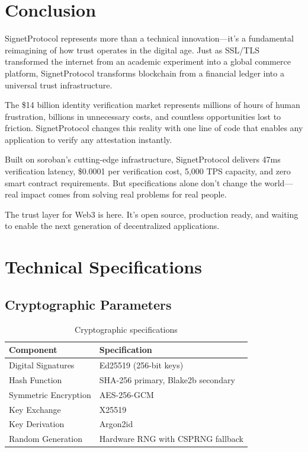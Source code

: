 \documentclass[11pt,a4paper]{article}
\begin{document}
\section{Conclusion}\label{sec:conclusion}

SignetProtocol represents more than a technical innovation---it's a fundamental reimagining of how trust operates in the digital age. Just as SSL/TLS transformed the internet from an academic experiment into a global commerce platform, SignetProtocol transforms blockchain from a financial ledger into a universal trust infrastructure.

The \$14 billion identity verification market represents millions of hours of human frustration, billions in unnecessary costs, and countless opportunities lost to friction. SignetProtocol changes this reality with one line of code that enables any application to verify any attestation instantly.

Built on \gls{soroban}'s cutting-edge infrastructure, SignetProtocol delivers 47ms verification latency, \$0.0001 per verification cost, 5,000 TPS capacity, and zero smart contract requirements. But specifications alone don't change the world---real impact comes from solving real problems for real people.

The trust layer for Web3 is here. It's open source, production ready, and waiting to enable the next generation of decentralized applications.

\newpage
\printglossary[title={Glossary of Terms}]

\newpage
\printindex

\newpage
\appendix

\section{Technical Specifications}\label{app:specs}

\subsection{Cryptographic Parameters}

\begin{table}[H]
\centering
\caption{Cryptographic specifications}
\begin{tabular}{@{}ll@{}}
\toprule
\textbf{Component} & \textbf{Specification} \\
\midrule
Digital Signatures & Ed25519 (256-bit keys) \\
Hash Function & SHA-256 primary, Blake2b secondary \\
Symmetric Encryption & AES-256-GCM \\
Key Exchange & X25519 \\
Key Derivation & Argon2id \\
Random Generation & Hardware RNG with CSPRNG fallback \\
\bottomrule
\end{tabular}
\end{table}
\end{document}
